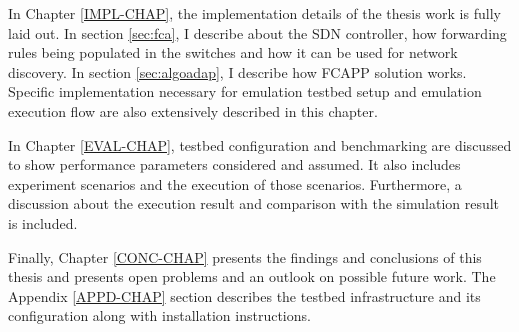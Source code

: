 In Chapter \ref{IMPL-CHAP}, the implementation details of the thesis work is fully laid out. In section \ref{sec:fca}, I describe about the SDN controller, how forwarding rules being populated in the switches and how it can be used for network discovery. In section \ref{sec:algoadap}, I describe how FCAPP solution works. Specific implementation necessary for emulation testbed setup and emulation execution flow are also extensively described in this chapter. 

In Chapter \ref{EVAL-CHAP}, testbed configuration and benchmarking are discussed to show performance parameters considered and assumed. It also includes experiment scenarios and the execution of those scenarios. Furthermore, a discussion about the execution result and comparison with the simulation result is included. 

Finally, Chapter \ref{CONC-CHAP} presents the findings and conclusions of this thesis and presents open problems and an outlook on possible future work. The Appendix \ref{APPD-CHAP} section describes the testbed infrastructure and its configuration along with installation instructions.




